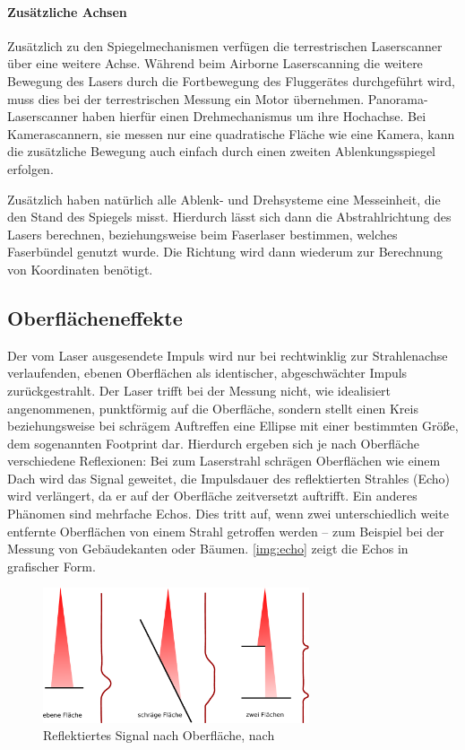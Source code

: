 \documentclass[a4paper,12pt,bibliography=totoc, listof=totoc,titlepage,pointlessnumbers]{scrreprt}
\begin{document}
\paragraph{Zusätzliche Achsen}
Zusätzlich zu den Spiegelmechanismen verfügen die terrestrischen Laser\-scan\-ner über eine weitere Achse. Während beim Airborne Laserscanning die weitere Bewegung des Lasers durch die Fortbewegung des Fluggerätes durchgeführt wird, muss dies bei der terrestrischen Messung ein Motor übernehmen. Panorama-Laser\-scan\-ner haben hierfür einen Drehmechanismus um ihre Hochachse. Bei Kamerascannern, sie messen nur eine quadratische Fläche wie eine Kamera, kann die zusätzliche Bewegung auch einfach durch einen zweiten Ablenkungsspiegel erfolgen. \citep[S. 37]{beraldin}

Zusätzlich haben natürlich alle Ablenk- und Drehsysteme eine Messeinheit, die den Stand des Spiegels misst. Hierdurch lässt sich dann die Abstrahlrichtung des Lasers berechnen, beziehungsweise beim Faserlaser bestimmen, welches Faserbündel genutzt wurde. Die Richtung wird dann wiederum zur Berechnung von Koordinaten benötigt.

\subsection{Oberflächeneffekte}
Der vom Laser ausgesendete Impuls wird nur bei rechtwinklig zur Strahlenachse verlaufenden, ebenen Oberflächen als identischer, abgeschwächter Impuls zurückgestrahlt. Der Laser trifft bei der Messung nicht, wie idealisiert angenommenen, punktförmig auf die Oberfläche, sondern stellt einen Kreis beziehungsweise bei schrägem Auftreffen eine Ellipse mit einer bestimmten Größe, dem sogenannten Footprint dar. Hierdurch ergeben sich je nach Oberfläche verschiedene Reflexionen: Bei zum Laserstrahl schrägen Oberflächen wie einem Dach wird das Signal geweitet, die Impulsdauer des reflektierten Strahles (Echo) wird verlängert, da er auf der Oberfläche zeitversetzt auftrifft. Ein anderes Phänomen sind mehrfache Echos. Dies tritt auf, wenn zwei unterschiedlich weite entfernte Oberflächen von einem Strahl getroffen werden -- zum Beispiel bei der Messung von Gebäudekanten oder Bäumen. \autoref{img:echo} zeigt die Echos in grafischer Form. \citep[S. 28]{beraldin}

\begin{figure}
 \centering
 \includegraphics[width=0.7\textwidth]{./img/echo.pdf}
 \caption{Reflektiertes Signal nach Oberfläche, nach \citet[S. 28]{beraldin}}
 \label{img:echo}
\end{figure}
\end{document}
